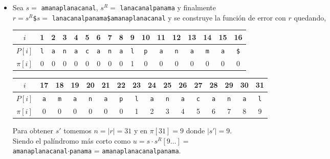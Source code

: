 \begin{itemize}
\item Sea $s = $ \texttt{amanaplanacanal}, $s^R =$ \texttt{lanacanalpanama} y finalmente\\
$r = s^R$\texttt{\$}$s =$ \texttt{lanacanalpanama\$amanaplanacanal} y se construye la función de
error con $r$ quedando,

\begin{table}[h]
\centering
\begin{tabular}{c|c|c|c|c|c|c|c|c|c|c|c|c|c|c|c|c|}
\cline{2-17}
$i$      & 1          & 2          & 3          & 4          & 5          & 6          & 7          & 8          & 9          & 10         & 11         & 12         & 13         & 14         & 15         & 16          \\ \hline
$P[i]$   & \texttt{l} & \texttt{a} & \texttt{n} & \texttt{a} & \texttt{c} & \texttt{a} & \texttt{n} & \texttt{a} & \texttt{l} & \texttt{p} & \texttt{a} & \texttt{n} & \texttt{a} & \texttt{m} & \texttt{a} & \texttt{\$} \\ \hline
$\pi[i]$ & 0          & 0          & 0          & 0          & 0          & 0          & 0          & 0          & 1          & 0          & 0          & 0          & 0          & 0          & 0          & 0           \\ \cline{2-17} 
\end{tabular}
\end{table}

\begin{table}[H]
\centering
\begin{tabular}{c|c|c|c|c|c|c|c|c|c|c|c|c|c|c|c|}
\cline{2-16}
$i$      & 17         & 18         & 19         & 20         & 21         & 22         & 23         & 24         & 25         & 26        & 27          & 28         & 29         & 30         & 31          \\ \hline
$P[i]$   & \texttt{a} & \texttt{m} & \texttt{a} & \texttt{n} & \texttt{a} & \texttt{p} & \texttt{l} & \texttt{a} & \texttt{n} & \texttt{a} & \texttt{c} & \texttt{a} & \texttt{n} & \texttt{a} & \texttt{l}  \\ \hline
$\pi[i]$ & 0          & 0          & 0          & 0          & 0          & 0          & 1          & 2          & 3          & 4          & 5          & 6          & 7          & 8          & 9           \\ \cline{2-16} 
\end{tabular}
\end{table}
Para obtener $s'$ tomemos $n = \vert r \vert = 31$ y en $\pi[31] = 9$ donde $\vert s' \vert = 9$.\\
Siendo el palíndromo más corto como $u = s \cdot s^R[9 \ldots] =$\\
\texttt{amanaplanacanal}$\cdot$\texttt{panama} = \texttt{amanaplanacanalpanama}.


\end{itemize}
